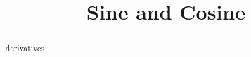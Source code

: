\documentclass{ximera}
\title{Sine and Cosine}
\begin{document}
\begin{abstract}
derivatives
\end{abstract}
\maketitle













\begin{center}
\end{center}
\end{document}
